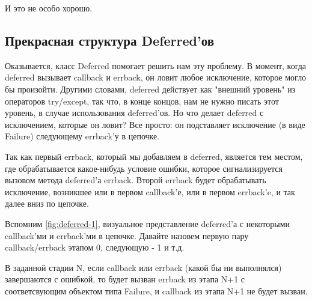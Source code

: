 И это не особо хорошо.


\subsection{Прекрасная структура Deferred'ов}

Оказывается, класс Deferred помогает решить нам эту проблему. 
В момент, когда deferred вызывает callback и errback, он 
ловит любое исключение, которое могло бы произойти. Другими 
словами, deferred действует как "внешний уровень" из операторов 
try/except, так что, в конце концов, нам не нужно писать этот уровень, 
в случае использования deferred'ов. Но что делает deferred 
с исключением, которые он ловит? Все просто: он подставляет исключение (в виде Failure) 
следующему errback'у в цепочке.


Так как первый errback, который мы добавляем в deferred, 
является тем местом, где обрабатывается какое-нибудь 
условие ошибки, которое сигнализируется вызовом метода 
deferred'а errback. Второй errback будет обрабатывать исключение, 
возникшее или в первом callback'е, или в первом 
errback'e, и так далее вниз по цепочке.


Вспомним \ref{fig:deferred-1}, визуальное представление deferred'а с 
некоторыми callback'ми и errback'ми в цепочке. Давайте назовем первую 
пару callback/errback этапом 0, следующую - 1 и т.д.


В заданной стадии N, если callback или errback (какой бы ни выполнялся) 
завершаются с ошибкой, то будет вызван errback из этапа N+1 с 
соответсвующим объектом типа Failure, и callback из этапа N+1 
не будет вызван. 



